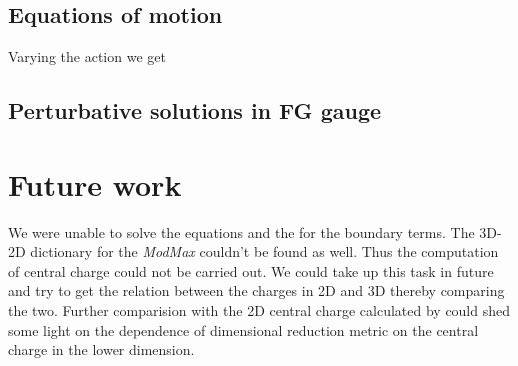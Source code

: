 \subsection{Equations of motion}
Varying the action we get 

\subsection{Perturbative solutions in FG gauge}



\section{Future work}
We were unable to solve the equations and the for the boundary terms. The 3D-2D dictionary for the \textit{ModMax} couldn't be found as well. Thus the computation of central charge could not be carried out. We could take up this task in future and try to get the relation between the charges in 2D and 3D thereby comparing the two. Further comparision with the 2D central charge calculated by \cite{rathi2023ads2} could shed some light on the dependence of dimensional reduction metric on the central charge in the lower dimension. 

